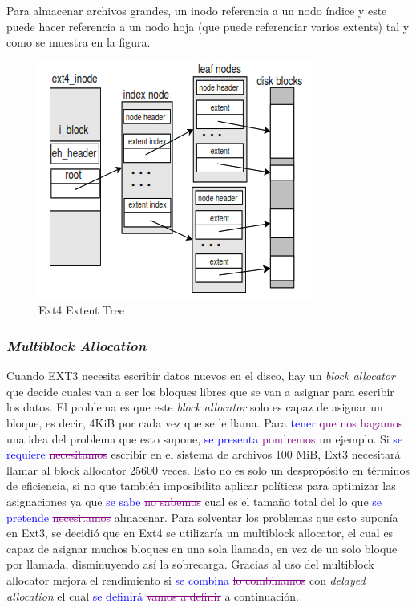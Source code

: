 Para almacenar archivos grandes, un inodo referencia a un nodo índice y este puede hacer referencia a un nodo hoja (que puede referenciar varios extents) tal y como se muestra en la figura.

\begin{figure}[H]
    \centering
    \includegraphics{doc/assets/images/ext4/ext4_map_extent_tree.PNG}
    \caption{Ext4 Extent Tree}
    \label{fig:Ext4 Extent Tree}
\end{figure}

\subsubsection{\textit{Multiblock Allocation}}
Cuando EXT3 necesita escribir datos nuevos en el disco, hay un \textit{block allocator} que decide cuales van a ser los bloques libres que se van a asignar para escribir los datos. El problema es que este \textit{block allocator} solo es capaz de asignar un bloque, es decir, 4KiB por cada vez que se le llama. Para \textcolor{blue}{tener} \textcolor{purple}{\sout{que nos hagamos}} una idea del problema que esto supone, \textcolor{blue}{se presenta} \textcolor{purple}{\sout{pondremos}} un ejemplo. Si \textcolor{blue}{se requiere} \textcolor{purple}{\sout{necesitamos}} escribir en el sistema de archivos 100 MiB, Ext3 necesitará llamar al block allocator 25600 veces. Esto no es solo un despropósito en términos de eficiencia, si no que también imposibilita aplicar políticas para optimizar las asignaciones ya que \textcolor{blue}{se sabe} \textcolor{purple}{\sout{no sabemos}} cual es el tamaño total del lo que \textcolor{blue}{se pretende} \textcolor{purple}{\sout{necesitamos}} almacenar. Para solventar los problemas que esto suponía en Ext3, se decidió que en Ext4 se utilizaría un multiblock allocator, el cual es capaz de asignar muchos bloques en una sola llamada, en vez de un solo bloque por llamada, disminuyendo así la sobrecarga. Gracias al uso del multiblock allocator mejora el rendimiento si \textcolor{blue}{se combina} \textcolor{purple}{\sout{lo combinamos}} con \textit{delayed allocation} el cual \textcolor{blue}{se definirá} \textcolor{purple}{\sout{vamos a definir}} a continuación. \cite{ext4howto} \\


